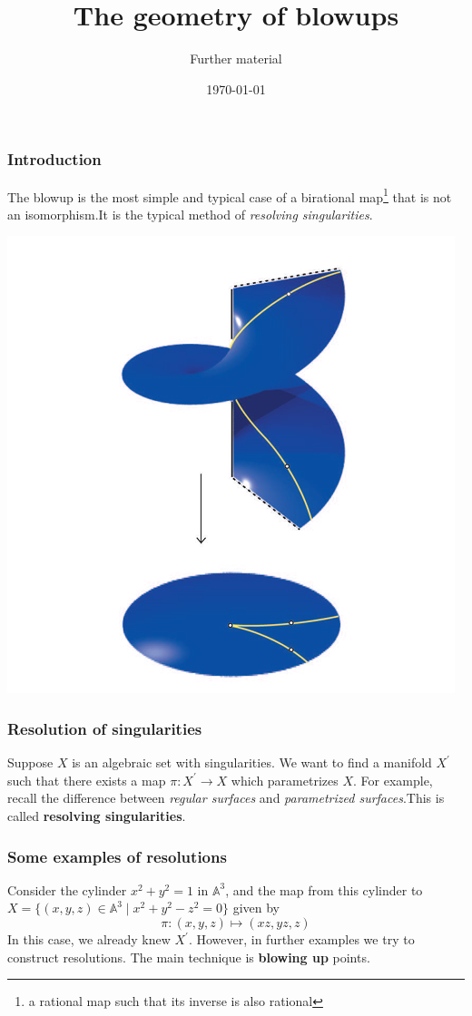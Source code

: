 \documentclass{beamer}
\title{The geometry of blowups}
\author{Further material}
\institute{Complex Singularities}
\date{\today}
\begin{document}
\begin{frame}
\titlepage
\end{frame}


\begin{frame}
\frametitle{Introduction}

The blowup is the most simple and typical case of a birational map\footnote{a rational map such that its inverse is also rational} that is not an isomorphism.\newline It is the typical method of \textit{resolving singularities}.

\begin{center}
    \includegraphics[scale=0.3]{1.PNG}
\end{center}

\end{frame}
\begin{frame}
\frametitle{Resolution of singularities}
Suppose $X$ is an algebraic set with singularities. We want to find a manifold $X^\prime$ such that there exists a map $\pi : X^\prime \to X$ which parametrizes $X$. For example, recall the difference between \textit{regular surfaces} and \textit{parametrized surfaces}.\newline\newline This is called \textbf{resolving singularities}.
\end{frame}
\begin{frame}
\frametitle{Some examples of resolutions}
\begin{example}
    Consider the cylinder $x^2 + y^2 = 1$ in $\mathbb{A}^3$, and the map from this cylinder to $X = \{(x,y,z) \in \mathbb{A}^3 \mid x^2 + y^2 - z^2 = 0\}$ given by \[\pi: (x,y,z) \mapsto (xz,yz,z)\] In this case, we already knew $X^\prime$. However, in further examples we try to construct resolutions. The main technique is \textbf{blowing up} points.
\end{example}
\end{frame}
\end{document}
